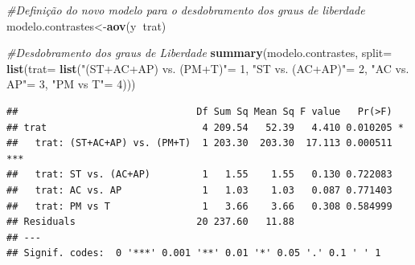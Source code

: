 \documentclass[
]{book}
\newenvironment{Shaded}{\begin{snugshade}}{\end{snugshade}}
\newcommand{\CommentTok}[1]{\textcolor[rgb]{0.56,0.35,0.01}{\textit{#1}}}
\newcommand{\DataTypeTok}[1]{\textcolor[rgb]{0.13,0.29,0.53}{#1}}
\newcommand{\DecValTok}[1]{\textcolor[rgb]{0.00,0.00,0.81}{#1}}
\newcommand{\KeywordTok}[1]{\textcolor[rgb]{0.13,0.29,0.53}{\textbf{#1}}}
\newcommand{\NormalTok}[1]{#1}
\newcommand{\OperatorTok}[1]{\textcolor[rgb]{0.81,0.36,0.00}{\textbf{#1}}}
\newcommand{\StringTok}[1]{\textcolor[rgb]{0.31,0.60,0.02}{#1}}
\begin{document}
\begin{Shaded}
\begin{Highlighting}[]
\CommentTok{#Definição do novo modelo para o desdobramento dos graus de liberdade}
\NormalTok{modelo.contrastes<-}\KeywordTok{aov}\NormalTok{(y}\OperatorTok{~}\NormalTok{trat)}

\CommentTok{#Desdobramento dos graus de Liberdade}
\KeywordTok{summary}\NormalTok{(modelo.contrastes, }
        \DataTypeTok{split=} \KeywordTok{list}\NormalTok{(}\DataTypeTok{trat=} 
                      \KeywordTok{list}\NormalTok{(}\StringTok{"(ST+AC+AP) vs. (PM+T)"}\NormalTok{=}\StringTok{ }\DecValTok{1}\NormalTok{, }
                           \StringTok{"ST vs. (AC+AP)"}\NormalTok{=}\StringTok{ }\DecValTok{2}\NormalTok{, }
                           \StringTok{"AC vs. AP"}\NormalTok{=}\StringTok{ }\DecValTok{3}\NormalTok{, }
                           \StringTok{"PM vs T"}\NormalTok{=}\StringTok{ }\DecValTok{4}\NormalTok{)))}
\end{Highlighting}
\end{Shaded}

\begin{verbatim}
##                               Df Sum Sq Mean Sq F value   Pr(>F)    
## trat                           4 209.54   52.39   4.410 0.010205 *  
##   trat: (ST+AC+AP) vs. (PM+T)  1 203.30  203.30  17.113 0.000511 ***
##   trat: ST vs. (AC+AP)         1   1.55    1.55   0.130 0.722083    
##   trat: AC vs. AP              1   1.03    1.03   0.087 0.771403    
##   trat: PM vs T                1   3.66    3.66   0.308 0.584999    
## Residuals                     20 237.60   11.88                     
## ---
## Signif. codes:  0 '***' 0.001 '**' 0.01 '*' 0.05 '.' 0.1 ' ' 1
\end{verbatim}

\begin{Shaded}
\end{Shaded}
\end{document}
